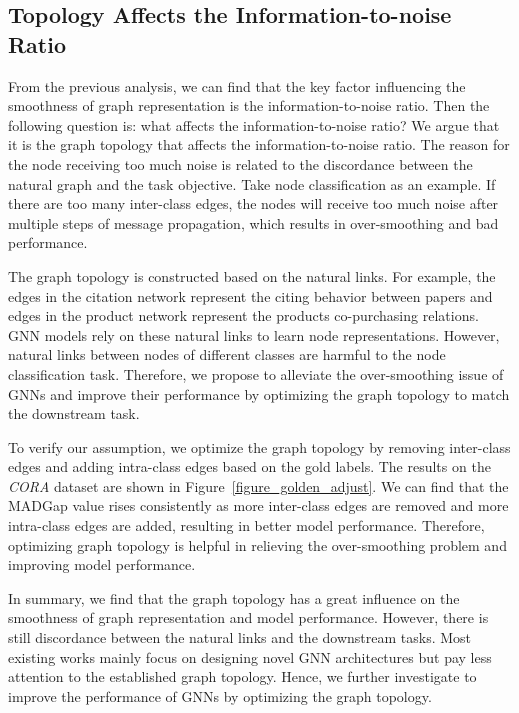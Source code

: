 \documentclass[letterpaper]{article} \usepackage{aaai20}  \usepackage{times}  \usepackage{helvet} \usepackage{courier}  \usepackage[hyphens]{url}  \usepackage{graphicx} \urlstyle{rm} \def\UrlFont{\rm}  \frenchspacing  \setlength{\pdfpagewidth}{8.5in}  \setlength{\pdfpageheight}{11in}  \setcounter{secnumdepth}{0}
\begin{document}
\subsection{Topology Affects the Information-to-noise Ratio}
From the previous analysis, we can find that the key factor influencing the smoothness of graph representation is the information-to-noise ratio.
Then the following question is: what affects the information-to-noise ratio?
We argue that it is the graph topology that affects the information-to-noise ratio. The reason for the node receiving too much noise is related to the discordance between the natural graph and the task objective.
Take node classification as an example. If there are too many inter-class edges, the nodes will receive too much noise after multiple steps of message propagation, which results in over-smoothing and bad performance. 

The graph topology is constructed based on the natural links. For example, the edges in the citation network represent the citing behavior between papers and edges in the product network represent the products co-purchasing relations.  
GNN models rely on these natural links to learn node representations. However, natural links between nodes of different classes are harmful to the node classification task. 
Therefore, we propose to alleviate the over-smoothing issue of GNNs and improve their performance by optimizing the graph topology to match the downstream task.

To verify our assumption, we optimize the graph topology by removing inter-class edges and adding intra-class edges based on the gold labels. The results on the  \textit{CORA} dataset are shown in Figure~\ref{figure_golden_adjust}.  We can find that the MADGap value rises consistently as more inter-class edges are removed and more intra-class edges are added, resulting in better model performance. Therefore, optimizing graph topology is helpful in relieving the over-smoothing problem and improving model performance.


In summary, we find that the graph topology has a great influence on the smoothness of graph representation and model performance. 
However, there is still discordance between the natural links and the downstream tasks. 
Most existing works mainly focus on designing novel GNN architectures but pay less attention to the established graph topology. 
Hence, we further investigate to improve the performance of GNNs by optimizing the graph topology. 
\end{document}
